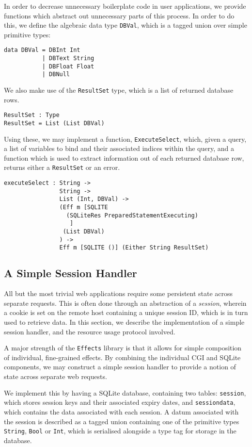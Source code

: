 \documentclass[preprint]{sigplanconf}
\begin{document}
In order to decrease unnecessary boilerplate code in user applications, we provide functions which abstract out unnecessary parts of this process. In order to do this, we define the algebraic data type \texttt{DBVal}, which is a tagged union over simple primitive types:
{\small
\begin{verbatim}
data DBVal = DBInt Int
           | DBText String
           | DBFloat Float
           | DBNull
\end{verbatim}
}
We also make use of the \texttt{ResultSet} type, which is a list of returned database rows.
\begin{verbatim}
ResultSet : Type
ResultSet = List (List DBVal)
\end{verbatim}
Using these, we may implement a function, \texttt{ExecuteSelect}, which, given a query, a list of variables to bind and their associated indices within the query, and a function which is used to extract information out of each returned database row, returns either a \texttt{ResultSet} or an error.
{\small
\begin{verbatim}
executeSelect : String ->
                String -> 
                List (Int, DBVal) -> 
                (Eff m [SQLITE 
                  (SQLiteRes PreparedStatementExecuting)
                   ] 
                 (List DBVal)
                ) -> 
                Eff m [SQLITE ()] (Either String ResultSet)
\end{verbatim}
}

\subsection{A Simple Session Handler}
All but the most trivial web applications require some persistent state across separate requests. This is often done through an abstraction of a \textit{session}, wherein a cookie is set on the remote host containing a unique session ID, which is in turn used to retrieve data. In this section, we describe the implementation of a simple session handler, and the resource usage protocol involved. 

A major strength of the \texttt{Effects} library is that it allows for simple composition of individual, fine-grained effects. By combining the individual CGI and SQLite components, we may construct a simple session handler to provide a notion of state across separate web requests. 

We implement this by having a SQLite database, containing two tables: \texttt{session}, which stores session keys and their associated expiry dates, and \texttt{sessiondata}, which contains the data associated with each session. A datum associated with the session is described as a tagged union containing one of the primitive types \texttt{String}, \texttt{Bool} or \texttt{Int}, which is serialised alongside a type tag for storage in the database.
\end{document}
